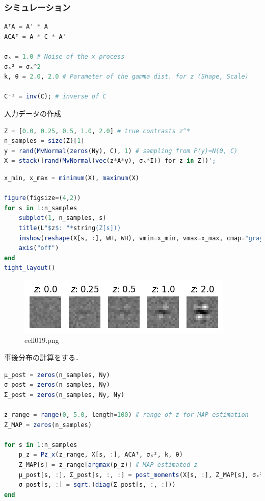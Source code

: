 \subsubsection{シミュレーション}
\begin{lstlisting}[language=julia]
AᵀA = A' * A
ACAᵀ = A * C * A'

σₓ = 1.0 # Noise of the x process
σₓ² = σₓ^2
k, θ = 2.0, 2.0 # Parameter of the gamma dist. for z (Shape, Scale)

C⁻¹ = inv(C); # inverse of C
\end{lstlisting}
入力データの作成
\begin{lstlisting}[language=julia]
Z = [0.0, 0.25, 0.5, 1.0, 2.0] # true contrasts z^*
n_samples = size(Z)[1]
y = rand(MvNormal(zeros(Ny), C), 1) # sampling from P(y)=N(0, C)
X = stack([rand(MvNormal(vec(z*A*y), σₓ*I)) for z in Z])';
\end{lstlisting}
\begin{lstlisting}[language=julia]
x_min, x_max = minimum(X), maximum(X)

figure(figsize=(4,2))
for s in 1:n_samples
    subplot(1, n_samples, s)
    title(L"$z$: "*string(Z[s]))
    imshow(reshape(X[s, :], WH, WH), vmin=x_min, vmax=x_max, cmap="gray")
    axis("off")
end
tight_layout()
\end{lstlisting}
\begin{figure}[ht]
	\centering
	\includegraphics[scale=0.8, max width=\linewidth]{./fig/bayesian-brain/neural-sampling/cell019.png}
	\caption{cell019.png}
	\label{cell019.png}
\end{figure}
事後分布の計算をする．
\begin{lstlisting}[language=julia]
μ_post = zeros(n_samples, Ny)
σ_post = zeros(n_samples, Ny)
Σ_post = zeros(n_samples, Ny, Ny)

z_range = range(0, 5.0, length=100) # range of z for MAP estimation
Z_MAP = zeros(n_samples) 

for s in 1:n_samples
    p_z = Pz_x(z_range, X[s, :], ACAᵀ, σₓ², k, θ)
    Z_MAP[s] = z_range[argmax(p_z)] # MAP estimated z
    μ_post[s, :], Σ_post[s, :, :] = post_moments(X[s, :], Z_MAP[s], σₓ², A, AᵀA, C⁻¹)
    σ_post[s, :] = sqrt.(diag(Σ_post[s, :, :]))
end
\end{lstlisting}
